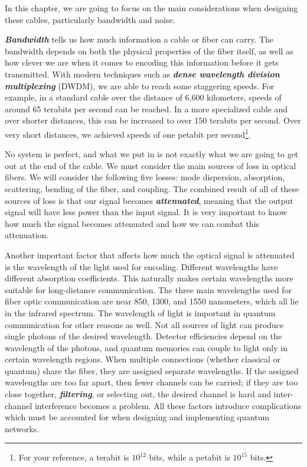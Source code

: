 In this chapter, we are going to focus on the main considerations when designing these cables, particularly bandwidth and noise.

\textbf{\emph{Bandwidth}} tells us how much information a cable or fiber can carry.
The bandwidth depends on both the physical properties of the fiber itself, as well as how clever we are when it comes to encoding this information before it gets transmitted.
With modern techniques such as \textbf{\emph{dense wavelength division multiplexing}} (DWDM), we are able to reach some staggering speeds.
For example, in a standard cable over the distance of 6,600 kilometers, speeds of around 65 terabits per second can be reached.
In a more specialized cable and over shorter distances, this can be increased to over 150 terabits per second.
Over very short distances, we achieved speeds of one petabit per second\footnote{For your reference, a terabit is $10^{12}$ bits, while a petabit is $10^{15}$ bits.}.

No system is perfect, and what we put in is not exactly what we are going to get out at the end of the cable.
We must consider the main sources of loss in optical fibers.
We will consider the following five losses: mode dispersion, absorption, scattering, bending of the fiber, and coupling.
The combined result of all of these sources of loss is that our signal becomes \textbf{\emph{attenuated}}, meaning that the output signal will have less power than the input signal.
It is very important to know how much the signal becomes attenuated and how we can combat this attenuation.

Another important factor that affects how much the optical signal is attenuated is the wavelength of the light used for encoding.
Different wavelengths have different absorption coefficients.
This naturally makes certain wavelengths more suitable for long-distance communication.
The three main wavelengths used for fiber optic communication are near 850, 1300, and 1550 nanometers, which all lie in the infrared spectrum.
The wavelength of light is important in quantum communication for other reasons as well.
Not all sources of light can produce single photons of the desired wavelength.
Detector efficiencies depend on the wavelength of the photons, and quantum memories can couple to light only in certain wavelength regions. When multiple connections (whether classical or quantum) share the fiber, they are assigned separate wavelengths.
If the assigned wavelengths are too far apart, then fewer channels can be carried; if they are too close together, \textbf{\emph{filtering}}, or selecting out, the desired channel is hard and inter-channel interference becomes a problem. 
All these factors introduce complications which must be accounted for when designing and implementing quantum networks.

